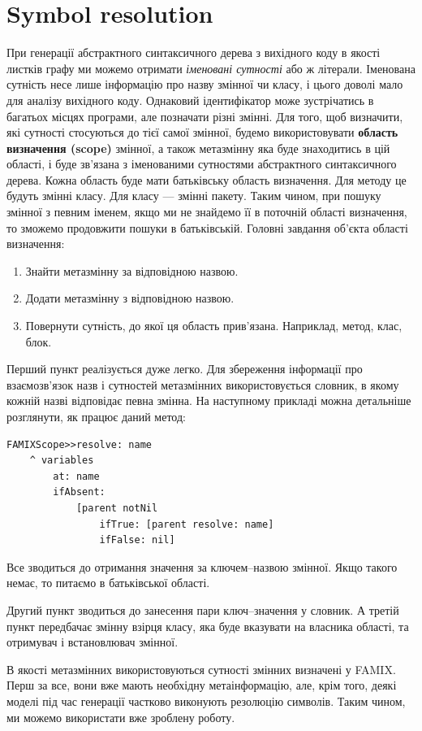 \documentclass[12pt,a4paper]{article}
\begin{document}
\section{Symbol resolution}
При генерації абстрактного синтаксичного дерева з вихідного коду в якості листків графу ми можемо отримати \emph{іменовані сутності} або ж літерали. Іменована сутність несе лише інформацію про назву змінної чи класу, і цього доволі мало для аналізу вихідного коду. Однаковий ідентифікатор може зустрічатись в багатьох місцях програми, але позначати різні змінні. Для того, щоб визначити, які сутності стосуються до тієї самої змінної, будемо використовувати \textbf{область визначення (scope)} змінної, а також метазмінну яка буде знаходитись в цій області, і буде зв'язана з іменованими сутностями абстрактного синтаксичного дерева. Кожна область буде мати батьківську область визначення. Для методу це будуть змінні класу. Для класу --- змінні пакету. Таким чином, при пошуку змінної з певним іменем, якщо ми не знайдемо її в поточній області визначення, то зможемо продовжити пошуки в батьківській. Головні завдання об'єкта області визначення:
\begin{enumerate}
\item Знайти метазмінну за відповідною назвою.
\item Додати метазмінну з відповідною назвою.
\item Повернути сутність, до якої ця область прив'язана. Наприклад, метод, клас, блок.
\end{enumerate}

Перший пункт реалізується дуже легко. Для збереження інформації про взаємозв'язок назв і сутностей метазмінних використовується словник, в якому кожній назві відповідає певна змінна. На наступному прикладі можна детальніше розглянути, як працює даний метод:
\begin{lstlisting}[language=Smalltalk]
FAMIXScope>>resolve: name
	^ variables
		at: name
		ifAbsent: 
			[parent notNil 
				ifTrue: [parent resolve: name] 
				ifFalse: nil]
\end{lstlisting}
Все зводиться до отримання значення за ключем--назвою змінної. Якщо такого немає, то питаємо в батьківської області.

Другий пункт зводиться до занесення пари ключ--значення у словник. А третій пункт передбачає змінну взірця класу, яка буде вказувати на власника області, та отримувач і встановлювач змінної.

В якості метазмінних використовуються сутності змінних визначені у FAMIX. Перш за все, вони вже мають необхідну метаінформацію, але, крім того, деякі моделі під час генерації частково виконують резолюцію символів. Таким чином, ми можемо використати вже зроблену роботу.
\end{document}
